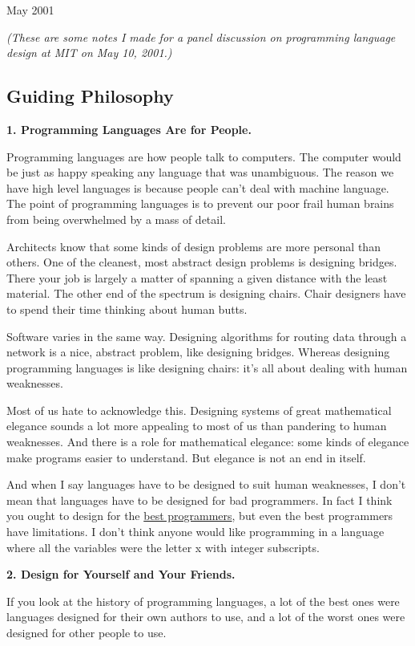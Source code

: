 May 2001

\emph{(These are some notes I made for a panel discussion on programming
language design at MIT on May 10, 2001.)}

\subsection{Guiding Philosophy}\label{guiding-philosophy}

\textbf{1. Programming Languages Are for People.}

Programming languages are how people talk to computers. The computer
would be just as happy speaking any language that was unambiguous. The
reason we have high level languages is because people can't deal with
machine language. The point of programming languages is to prevent our
poor frail human brains from being overwhelmed by a mass of detail.

Architects know that some kinds of design problems are more personal
than others. One of the cleanest, most abstract design problems is
designing bridges. There your job is largely a matter of spanning a
given distance with the least material. The other end of the spectrum is
designing chairs. Chair designers have to spend their time thinking
about human butts.

Software varies in the same way. Designing algorithms for routing data
through a network is a nice, abstract problem, like designing bridges.
Whereas designing programming languages is like designing chairs: it's
all about dealing with human weaknesses.

Most of us hate to acknowledge this. Designing systems of great
mathematical elegance sounds a lot more appealing to most of us than
pandering to human weaknesses. And there is a role for mathematical
elegance: some kinds of elegance make programs easier to understand. But
elegance is not an end in itself.

And when I say languages have to be designed to suit human weaknesses, I
don't mean that languages have to be designed for bad programmers. In
fact I think you ought to design for the \href{design.html}{best
programmers}, but even the best programmers have limitations. I don't
think anyone would like programming in a language where all the
variables were the letter x with integer subscripts.

\textbf{2. Design for Yourself and Your Friends.}

If you look at the history of programming languages, a lot of the best
ones were languages designed for their own authors to use, and a lot of
the worst ones were designed for other people to use.

